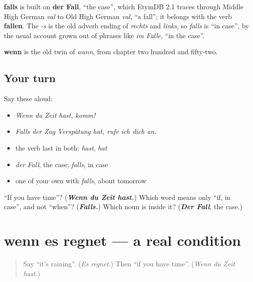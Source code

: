 \begin{cousinweb}
\textbf{falls} is built on \textbf{der Fall}, \textquotedblleft{}the case\textquotedblright{}, which EtymDB 2.1 traces through Middle High German \emph{val} to Old High German \emph{val}, \textquotedblleft{}a fall\textquotedblright{}; it belongs with the verb \textbf{fallen}. The \emph{-s} is the old adverb ending of \emph{rechts} and \emph{links}, so \emph{falls} is \textquotedblleft{}in case\textquotedblright{}, by the usual account grown out of phrases like \emph{im Falle}, \textquotedblleft{}in the case\textquotedblright{}.

\textbf{wenn} is the old twin of \emph{wann}, from chapter two hundred and fifty-two.
\end{cousinweb}

\subsection*{Your turn}
Say these aloud:

\begin{itemize}
\raggedright
  \item \emph{Wenn du Zeit hast, komm!}
  \item \emph{Falls der Zug Verspätung hat, rufe ich dich an.}
  \item the verb last in both: \emph{hast}, \emph{hat}
  \item \emph{der Fall}, the case; \emph{falls}, in case
  \item one of your own with \emph{falls}, about tomorrow
\end{itemize}

\begin{tcolorbox}[breakable,colback=teal!4,colframe=teal!35!black,title={Before you move on}]
\textquotedblleft{}If you have time\textquotedblright{}? (\emph{\textbf{Wenn du Zeit hast.}}) Which word means only \textquotedblleft{}if, in case\textquotedblright{}, and not \textquotedblleft{}when\textquotedblright{}? (\emph{\textbf{Falls.}}) Which noun is inside it? (\emph{\textbf{Der Fall}}, the case.)
\end{tcolorbox}
\section[wenn es regnet, …]{wenn es regnet — a real condition}

\label{lesson:GE-C260-wenn-es-regnet}



\begin{quote}
Say \textquotedblleft{}it's raining\textquotedblright{}. (\emph{Es regnet.}) Then \textquotedblleft{}if you have time\textquotedblright{}. (\emph{Wenn du Zeit hast.})
\end{quote}

